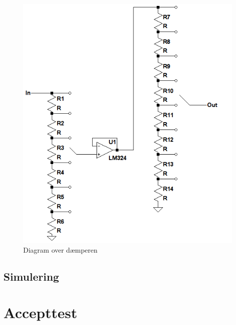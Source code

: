 \begin{figure}[h]
\centering
\includegraphics[scale=1]{teknisk/volumenkontrol/daemper.png}
\caption{Diagram over dæmperen}
\label{fig:volumenkontrol_daemper}
\end{figure}

\subsection*{Simulering}
\label{volumenkontrol-simulering}

\section{Accepttest}
\label{volumenkontrol-accepttest}

